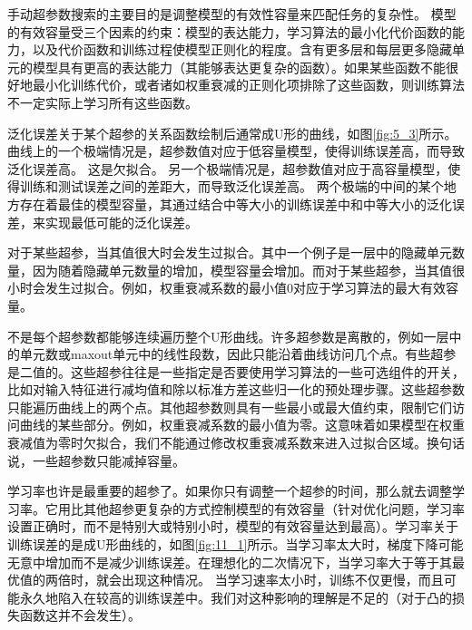 手动超参数搜索的主要目的是调整模型的有效性容量来匹配任务的复杂性。 模型的有效容量受三个因素的约束：模型的表达能力，学习算法的最小化代价函数的能力，以及代价函数和训练过程使模型正则化的程度。含有更多层和每层更多隐藏单元的模型具有更高的表达能力（其能够表达更复杂的函数）。如果某些函数不能很好地最小化训练代价，或者诸如权重衰减的正则化项排除了这些函数，则训练算法不一定实际上学习所有这些函数。

泛化误差关于某个超参的关系函数绘制后通常成U形的曲线，如图\ref{fig:5_3}所示。曲线上的一个极端情况是，超参数值对应于低容量模型，使得训练误差高，而导致泛化误差高。 这是欠拟合。 另一个极端情况是，超参数值对应于高容量模型，使得训练和测试误差之间的差距大，而导致泛化误差高。 两个极端的中间的某个地方存在着最佳的模型容量，其通过结合中等大小的训练误差中和中等大小的泛化误差，来实现最低可能的泛化误差。

对于某些超参，当其值很大时会发生过拟合。其中一个例子是一层中的隐藏单元数量，因为随着隐藏单元数量的增加，模型容量会增加。而对于某些超参，当其值很小时会发生过拟合。例如，权重衰减系数的最小值0对应于学习算法的最大有效容量。

不是每个超参数都能够连续遍历整个U形曲线。许多超参数是离散的，例如一层中的单元数或maxout单元中的线性段数，因此只能沿着曲线访问几个点。有些超参是二值的。这些超参往往是一些指定是否要使用学习算法的一些可选组件的开关，比如对输入特征进行减均值和除以标准方差这些归一化的预处理步骤。这些超参数只能遍历曲线上的两个点。其他超参数则具有一些最小或最大值约束，限制它们访问曲线的某些部分。例如，权重衰减系数的最小值为零。这意味着如果模型在权重衰减值为零时欠拟合，我们不能通过修改权重衰减系数来进入过拟合区域。换句话说，一些超参数只能减掉容量。

学习率也许是最重要的超参了。如果你只有调整一个超参的时间，那么就去调整学习率。它用比其他超参更复杂的方式控制模型的有效容量（针对优化问题，学习率设置正确时，而不是特别大或特别小时，模型的有效容量达到最高）。学习率关于训练误差的是成U形曲线的，如图\ref{fig:11_1}所示。当学习率太大时，梯度下降可能无意中增加而不是减少训练误差。在理想化的二次情况下，当学习率大于等于其最优值的两倍时，就会出现这种情况\citep{LeCun+98backprop-small}。 当学习速率太小时，训练不仅更慢，而且可能永久地陷入在较高的训练误差中。我们对这种影响的理解是不足的（对于凸的损失函数这并不会发生）。


